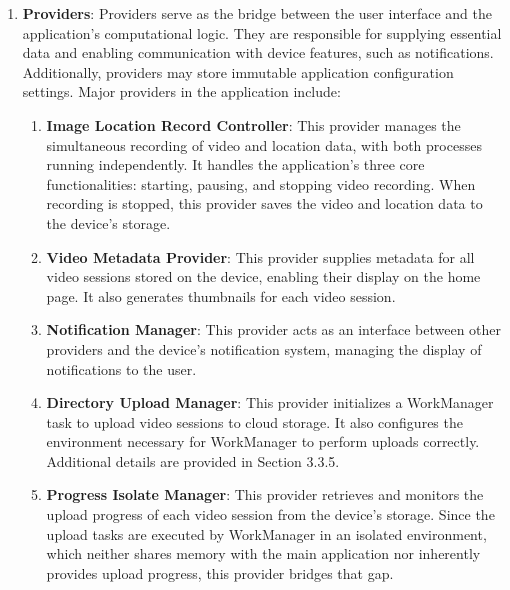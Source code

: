 \begin{enumerate}
    \item \textbf{Providers}: Providers serve as the bridge between the user interface and the application's computational logic. They are responsible for supplying essential data and enabling communication with device features, such as notifications. Additionally, providers may store immutable application configuration settings. Major providers in the application include:
    \begin{enumerate}
        \item \textbf{Image Location Record Controller}: This provider manages the simultaneous recording of video and location data, with both processes running independently. It handles the application's three core functionalities: starting, pausing, and stopping video recording. When recording is stopped, this provider saves the video and location data to the device's storage.
        \item \textbf{Video Metadata Provider}: This provider supplies metadata for all video sessions stored on the device, enabling their display on the home page. It also generates thumbnails for each video session.  
        \item \textbf{Notification Manager}: This provider acts as an interface between other providers and the device's notification system, managing the display of notifications to the user.  
        \item \textbf{Directory Upload Manager}: This provider initializes a WorkManager task to upload video sessions to cloud storage. It also configures the environment necessary for WorkManager to perform uploads correctly. Additional details are provided in Section 3.3.5. %
        \item \textbf{Progress Isolate Manager}: This provider retrieves and monitors the upload progress of each video session from the device's storage. Since the upload tasks are executed by WorkManager in an isolated environment, which neither shares memory with the main application nor inherently provides upload progress, this provider bridges that gap.
    \end{enumerate}
    

\end{enumerate}
